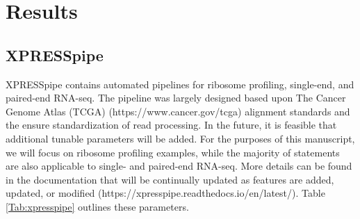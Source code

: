 \documentclass[11pt, a4paper, oneside]{article}
\begin{document}
\section{Results}

\subsection{XPRESSpipe}
XPRESSpipe contains automated pipelines for ribosome profiling, single-end, and paired-end RNA-seq. The pipeline was largely designed based upon The Cancer Genome Atlas (TCGA) (https://www.cancer.gov/tcga) alignment standards and the ensure standardization of read processing. In the future, it is feasible that additional tunable parameters will be added. For the purposes of this manuscript, we will focus on ribosome profiling examples, while the majority of statements are also applicable to single- and paired-end RNA-seq. More details can be found in the documentation that will be continually updated as features are added, updated, or modified (https://xpresspipe.readthedocs.io/en/latest/). Table \ref{Tab:xpresspipe} outlines these parameters.
\end{document}
